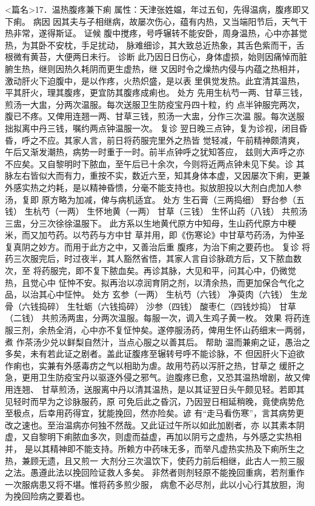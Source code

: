 \documentclass[a4paper,12pt,UTF8,twoside]{ctexbook}
\begin{document}
<篇名>17．温热腹疼兼下痢
属性：天津张姓媪，年过五旬，先得温病，腹疼即又下痢。 
病因 因其夫与子相继病，故屡次伤心，蕴有内热，又当端阳节后，天气干热非常，遂得斯证。 
证候 腹中搅疼，号呼辗转不能安卧，周身温热，心中亦甚觉热，为其卧不安枕，手足扰动， 
脉难细诊，其大致总近热象，其舌色紫而干，舌根微有黄苔，大便两日未行。 
诊断 此乃因日日伤心，身体虚损，始则因痛悼而脏腑生热，继则因热久耗阴而更生虚热，继 
又因时令之燥热内侵与内蕴之热相并，激动肝火下迫腹中，是以作疼，火热炽盛，是以表 
里俱觉发热。此宜清其温热，平其肝火，理其腹疼，更宜防其腹疼成痢也。 
处方 先用生杭芍一两、甘草三钱，煎汤一大盅，分两次温服。每次送服卫生防疫宝丹四十粒，约 
点半钟服完两次，腹已不疼。又俾用连翘一两、甘草三钱，煎汤一大盅，分作三次温 
服。每次送服拙拟离中丹三钱，嘱约两点钟温服一次。 
复诊 翌日晚三点钟，复为诊视，闭目昏昏，呼之不应。其家人言，前日将药服完里外之热皆 
觉轻减，午前精神颇清爽，午后又渐发潮热，病势一时重于一时。前半点钟呼之犹知答应， 
兹则大声呼之亦不应矣。又自黎明时下脓血，至午后已十余次，今则将近两点钟未见下矣。诊 
其脉左右皆似大而有力，重按不实，数近六至，知其身体本虚，又因屡次下痢，更兼 
外感实热之灼耗，是以精神昏愦，分毫不能支持也。拟放胆投以大剂白虎加人参汤，复即 
原方略为加减，俾与病机适宜。 
处方 生石膏（三两捣细） 野台参（五钱） 生杭芍（一两） 生怀地黄（一两） 
甘草（三钱） 生怀山药（八钱） 
共煎汤三盅，分三次徐徐温服下。 
此方系以生地黄代原方中知母，生山药代原方中粳米，而又加芍药。以芍药与方中甘 
草并用，即《伤寒论》中甘草芍药汤，为仲圣复真阴之妙方。而用于此方之中，又善治后重 
腹疼，为治下痢之要药也。 
复诊 将药三次服完后，时过夜半，其人豁然省悟，其家人言自诊脉疏方后，又下脓血数次，至 
将药服完，即不复下脓血矣。再诊其脉，大见和平，问其心中，仍微觉热，且觉心中 
怔忡不安。拟再治以凉润育阴之剂，以清余热，而更加保合气化之品，以治其心中怔忡。 
处方 玄参（一两） 生杭芍（六钱） 净萸肉（六钱） 生龙骨（六钱捣碎） 
生牡蛎（六钱捣碎） 沙参（四钱） 酸枣仁（四钱炒捣） 甘草（二钱） 
共煎汤两盅，分两次温服。每服一次，调入生鸡子黄一枚。 
效果 将药连服三剂，余热全消，心中亦不复怔忡矣。遂停服汤药，俾用生怀山药细末一两弱，煮 
作茶汤少兑以鲜梨自然汁，当点心服之以善其后。 
帮助 温而兼痢之证，愚治之多矣，未有若此证之剧者。盖此证腹疼至辗转号呼不能诊脉，不 
但因肝火下迫欲作痢也，实兼有外感毒疠之气以相助为虐。故用芍药以泻肝之热，甘草之 
缓肝之急，更用卫生防疫宝丹以驱逐外侵之邪气。迨腹疼已愈，又恐其温热增剧，故又俾用连翘、 
甘草煎汤，送服离中丹以清其温热，是以其证翌日头午颇见轻。若即其见轻时而早为之诊脉服药，原 
可免后此之昏沉，乃因翌日相延稍晚，竟使病势危至极点，后幸用药得宜，犹能挽回，然亦险矣。谚 
有“走马看伤寒”，言其病势更改之速也。至治温病亦何独不然哉。又此证过午所以如此加剧者，亦 
以其素本阴虚，又自黎明下痢脓血多次，则虚而益虚，再加以阴亏之虚热，与外感之实热相并， 
是以其精神即不能支持。所赖方中药味无多，而举凡虚热实热及下痢所生之热，兼顾无遗，且又煎一 
大剂分三次温饮下，使药力前后相继，此古人一煎三服之法。愚遵此法以挽回险证救人多矣。 
非然者则剂轻原不能挽回重病，若剂重作一次服病患又将不堪。惟将药多煎少服， 
病愈不必尽剂，此以小心行其放胆，洵为挽回险病之要着也。 
\end{document}
